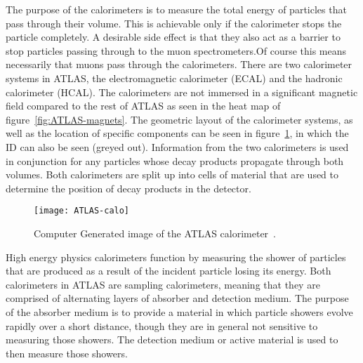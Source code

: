 The purpose of the calorimeters is to measure the total energy of particles that
pass through their volume. This is achievable only if the calorimeter stops the
particle completely. A desirable side effect is that they also act as a barrier
to stop particles passing through to the muon spectrometers.Of course this
means necessarily that muons pass through the calorimeters. There are two
calorimeter systems in ATLAS, the electromagnetic calorimeter (ECAL) and the
hadronic calorimeter (HCAL). The calorimeters are not immersed in a significant
magnetic field compared to the rest of ATLAS as seen in the heat map of
figure~\ref{fig:ATLAS-magnets}. The geometric layout of the calorimeter systems,
as well as the location of specific components can be seen in
figure~\ref{fig:ATLAS-calo}, in which the ID can also be seen (greyed out).
Information from the two calorimeters is used in conjunction for any particles
whose decay products propagate through both volumes. Both calorimeters are split
up into cells of material that are used to determine the position of decay
products in the detector.
\begin{figure}[ht] \centering \texttt{[image: ATLAS-calo]}
  \caption[ATLAS Calorimeter]{Computer Generated image of the ATLAS
calorimeter~\cite{ATLAS-calo-fig}.}%
  \label{fig:ATLAS-calo}
\end{figure}

High energy physics calorimeters function by measuring the shower
of particles that are produced as a result of the incident particle losing its
energy. Both calorimeters in ATLAS are sampling calorimeters, meaning that they
are comprised of alternating layers of absorber and detection medium. The purpose
of the absorber medium is to provide a material in which particle showers evolve
rapidly over a short distance, though they are in general not sensitive to
measuring those showers. The detection medium or active material is used to then
measure those showers.

